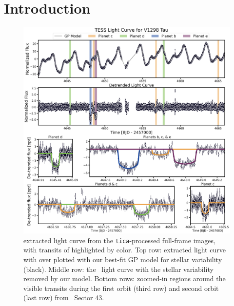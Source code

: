 \documentclass[twocolumn]{aastex631}
\begin{document}
\section{Introduction}


\begin{figure}[!ht]
\begin{center}
\includegraphics[width=\textwidth,trim={0.25cm 0 0 0}]{static/lightcurve.pdf}
\caption{\sname extracted light curve from the \texttt{tica}-processed full-frame images, with transits of \allplanets highlighted by color. Top row: extracted light curve with over plotted with our best-fit GP model for stellar variability (black). Middle row: the \tess\ light curve with the stellar variability removed by our model. Bottom rows: zoomed-in regions around the visible transits during the first orbit (third row) and second orbit (last row) from \tess\ Sector 43. \label{fig:transits}}
\end{center}
\end{figure}
\end{document}
